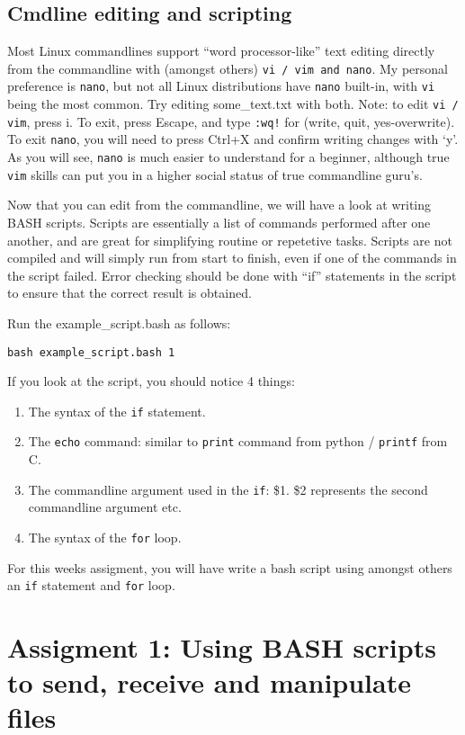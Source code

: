\documentclass[a4paper]{article}
\begin{document}
\subsection{Cmdline editing and scripting}
Most Linux commandlines support ``word processor-like'' text editing directly from the commandline with (amongst others) \texttt{vi / vim and nano}. My personal preference is \texttt{nano}, but not all Linux distributions have \texttt{nano} built-in, with \texttt{vi} being the most common. Try editing some\_text.txt with both. 
Note: to edit \texttt{vi / vim}, press i. To exit, press Escape, and type \texttt{:wq!} for (write, quit, yes-overwrite). To exit \texttt{nano}, you will need to press Ctrl+X and confirm writing changes with `y'. As you will see, \texttt{nano} is much easier to understand for a beginner, although true \texttt{vim} skills can put you in a higher social status of true commandline guru's.

Now that you can edit from the commandline, we will have a look at writing BASH scripts. Scripts are essentially a list of commands performed after one another, and are great for simplifying routine or repetetive tasks. Scripts are not compiled and will simply run from start to finish, even if one of the commands in the script failed. Error checking should be done with ``if'' statements in the script to ensure that the correct result is obtained. 

Run the example\_script.bash as follows:
\begin{lstlisting}
bash example_script.bash 1
\end{lstlisting}

If you look at the script, you should notice 4 things: 
\begin{enumerate}
\item The syntax of the \texttt{if} statement. 
\item The \texttt{echo} command: similar to \texttt{print} command from python / \texttt{printf} from C. 
\item The commandline argument used in the \texttt{if}: \$1. \$2 represents the second commandline argument etc. 
\item The syntax of the \texttt{for} loop. 
\end{enumerate}

For this weeks assigment, you will have write a bash script using amongst others an \texttt{if} statement and \texttt{for} loop. 

\section{Assigment 1: Using BASH scripts to send, receive and manipulate files}
\end{document}
